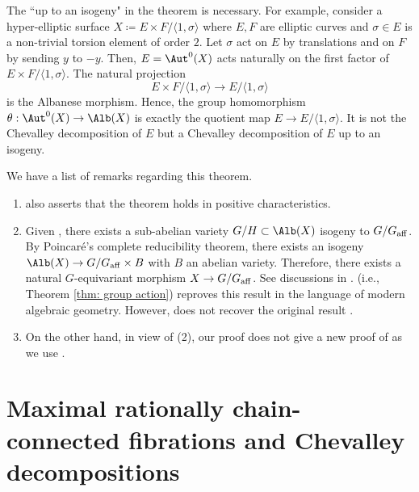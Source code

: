 \documentclass[11pt]{amsart}
\begin{document}
\begin{remark}
The ``up to an isogeny" in the theorem is necessary. For example, consider a hyper-elliptic surface $X \coloneqq E \times F/\langle 1, \sigma \rangle$ where $E, F$ are elliptic curves and $\sigma \in E$ is a non-trivial torsion element of order $2$. Let $\sigma$ act on $E$ by translations and on $F$ by sending $y$ to $-y$. Then, $E= \Aut^0(X)$ acts naturally on the first factor of $E \times F/\langle 1, \sigma \rangle$. The natural projection
\[
E \times F/\langle 1, \sigma \rangle \to E/\langle 1, \sigma \rangle
\] is the Albanese morphism. Hence, the group homomorphism $\theta: \Aut^0(X) \to \Alb(X)$ is exactly the quotient map $E \to E/\langle 1, \sigma \rangle$. It is not the Chevalley decomposition of $E$ but a Chevalley decomposition of $E$ up to an isogeny.
\end{remark}

\begin{remark}\label{rmk: Mat63}
We have a list of remarks regarding this theorem.
\begin{enumerate}
    \item \cite[Theorem 2]{Mat63} also asserts that the theorem holds in positive characteristics. 

    \item Given \cite[Theorem 2]{Mat63}, there exists a sub-abelian variety $G/H \subset \Alb(X)$ isogeny to $G/G_{\rm aff}$. By Poincar\'e's complete reducibility theorem, there exists an isogeny $\Alb(X) \to G/G_{\rm aff} \times B$ with $B$ an abelian variety. Therefore, there exists a natural $G$-equivariant morphism $X \to G/G_{\rm aff}$. See discussions in \cite[\S 4, page 12]{Bri10}. \cite[Theorem 2]{Bri10} (i.e., Theorem \ref{thm: group action}) reproves this result in the language of modern algebraic geometry. However, \cite[Theorem 2]{Bri10} does not recover the original result \cite[Theorem 2]{Mat63}.

    \item On the other hand, in view of (2), our proof does not give a new proof of \cite[Theorem 2]{Bri10} as we use \cite[Theorem 2]{Bri10}.
    \end{enumerate}
\end{remark}

\section{Maximal rationally chain-connected fibrations  and Chevalley decompositions}\label{sec: MRCC}
\end{document}
